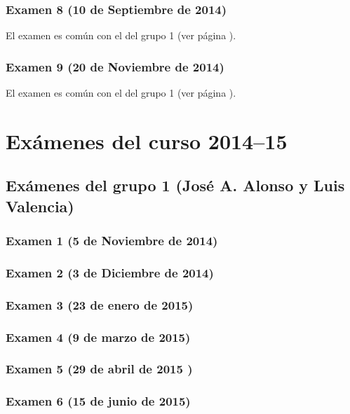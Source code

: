 \documentclass[a4paper,12pt,twoside]{book}
\begin{document}
\subsection{Examen 8 (10 de Septiembre de 2014)}
El examen es común con el del grupo 1 (ver página \pageref{examen_13_14_3_8}).
\subsection{Examen 9 (20 de Noviembre de 2014)}
El examen es común con el del grupo 1 (ver página \pageref{examen_13_14_3_9}).

\chapter{Exámenes del curso 2014--15}

\section{Exámenes del grupo 1 (José A. Alonso y Luis Valencia)}
\subsection{Examen 1 (5 de Noviembre de 2014)}
\subsection{Examen 2 (3 de Diciembre de 2014)}
\subsection{Examen 3 (23 de enero de 2015)}
 \label{examen_14_15_5_3}
\subsection{Examen 4 (9 de marzo de 2015)}
\subsection{Examen 5 (29 de abril de 2015 )}
\subsection{Examen 6 (15 de junio de 2015)}
\end{document}
